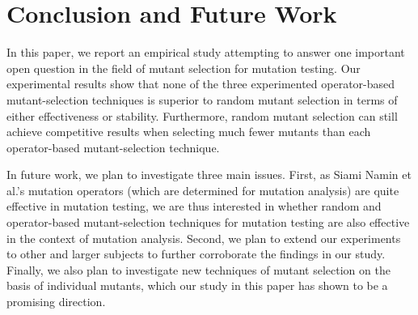 \vspace{-1ex}
\section{Conclusion and Future Work}
\label{Conclusion}

In this paper, we report an empirical study attempting to answer
one important open question in the field of mutant selection for
mutation testing. Our experimental results show that none of the
three experimented operator-based mutant-selection techniques is
superior to random mutant selection in terms of either
effectiveness or stability. Furthermore, random mutant selection
can still achieve competitive results when selecting much fewer
mutants than each operator-based mutant-selection technique.

In future work, we plan to investigate three main issues. First,
as Siami Namin et al.'s mutation operators (which are determined
for mutation analysis) are quite effective in mutation testing, we
are thus interested in whether random and operator-based
mutant-selection techniques for mutation testing are also
effective in the context of mutation analysis. Second, we plan to
extend our experiments to other and larger subjects to further
corroborate the findings in our study. Finally, we also plan to
investigate new techniques of mutant selection on the basis of
individual mutants, which our study in this paper has shown to be
a promising direction.
